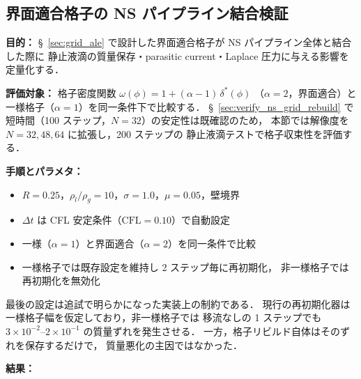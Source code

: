 %
\subsection{界面適合格子の NS パイプライン結合検証}
\label{sec:nonuniform_grid_ns}

\noindent\textbf{目的：}
§~\ref{sec:grid_ale} で設計した界面適合格子が NS パイプライン全体と結合した際に
静止液滴の質量保存・parasitic current・Laplace 圧力に与える影響を定量化する．

\noindent\textbf{評価対象：}
格子密度関数 $\omega(\phi) = 1 + (\alpha{-}1)\,\delta^*(\phi)$
（$\alpha = 2$，界面適合）と一様格子（$\alpha = 1$）を同一条件下で比較する．
§~\ref{sec:verify_ns_grid_rebuild} で短時間（100 ステップ，$N{=}32$）の安定性は既確認のため，
本節では解像度を $N = 32, 48, 64$ に拡張し，200 ステップの
静止液滴テストで格子収束性を評価する．

\noindent\textbf{手順とパラメタ：}
\begin{itemize}[noitemsep]
  \item $R = 0.25$，$\rho_l/\rho_g = 10$，$\sigma = 1.0$，$\mu = 0.05$，壁境界
  \item $\Delta t$ は CFL 安定条件（$\mathrm{CFL} = 0.10$）で自動設定
  \item 一様（$\alpha = 1$）と界面適合（$\alpha = 2$）を同一条件で比較
  \item 一様格子では既存設定を維持し 2 ステップ毎に再初期化，
        非一様格子では再初期化を無効化
\end{itemize}

\noindent
最後の設定は追試で明らかになった実装上の制約である．
現行の再初期化器は一様格子幅を仮定しており，非一様格子では
移流なしの 1 ステップでも $3\times10^{-2}$--$2\times10^{-1}$ の質量ずれを発生させる．
一方，格子リビルド自体はそのずれを保存するだけで，
質量悪化の主因ではなかった．

\noindent\textbf{結果：}


